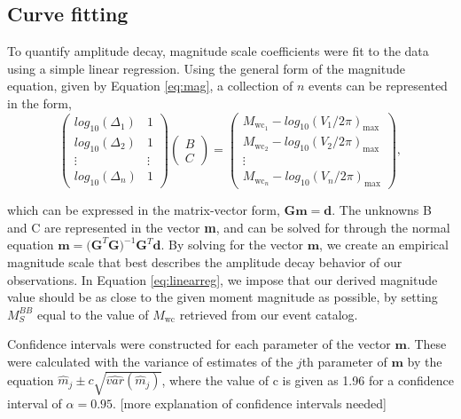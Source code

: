 \documentclass{gji}
\begin{document}
\subsection{Curve fitting}
To quantify amplitude decay, magnitude scale coefficients were fit to the data using a simple linear regression. Using the general form of the magnitude equation, given by Equation \ref{eq:mag}, a collection of $n$ events can be represented in the form, 
\begin{equation}
	\begin{pmatrix}
		log_{10}(\Delta_{1}) & 1 \\
		log_{10}(\Delta_{2}) & 1 \\
		\vdots  & \vdots \\
		log_{10}(\Delta_{n}) & 1 
	\end{pmatrix}
	\begin{pmatrix}
		{B}\\
		{C}
	\end{pmatrix}
	=
	\begin{pmatrix}
		M_{\text{wc}_1} - log_{10}({V_1}/{2\pi})_{\text{max}} \\
		M_{\text{wc}_2} - log_{10}({V_2}/{2\pi})_{\text{max}} \\
		\vdots  \\
		M_{\text{wc}_n} - log_{10}({V_n}/{2\pi})_{\text{max}}
	\end{pmatrix},
	\label{eq:linearreg}
\end{equation}

\noindent which can be expressed in the matrix-vector form, $\mathbf{Gm = d}$. The unknowns B and C are represented in the vector {\bfseries m}, and can be solved for through the normal equation $\mathbf{m} = \mathbf{(G}^{T}\mathbf{G})^{-1}\mathbf{G}^T\mathbf{d}$. By solving for the vector $\mathbf{m}$, we create an empirical magnitude scale that best describes the amplitude decay behavior of our observations. In Equation \ref{eq:linearreg}, we impose that our derived magnitude value should be as close to the given moment magnitude as possible, by setting $M_S^{BB}$ equal to the value of $M_\text{wc}$ retrieved from our event catalog. 

Confidence intervals were constructed for each parameter of the vector $\mathbf{m}$. These were calculated with the variance of estimates of the $j$th parameter of $\mathbf{m}$ by the equation $\hat{m}_j \pm c \sqrt{\hat{var}(\hat{m}_j)}$, where the value of c is given as 1.96 for a confidence interval of $\alpha = 0.95$. [more explanation of confidence intervals needed]
\end{document}

